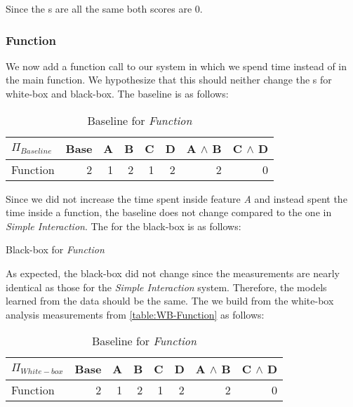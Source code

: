 Since the {\perfInfluenceModel}s are all the same both scores are 0.

\subsubsection*{Function}
We now add a function call to our system in which we spend time instead of in the main function. 
We hypothesize that this should neither change the {\perfInfluenceModel}s for white-box and black-box. 
The baseline {\perfInfluenceModel} is as follows:

\begin{table}[H]
    \centering
    \begin{tabular}{lrrrrrrr}
    \toprule
    $\Pi_{Baseline}$    & Base & A & B & C & D & A $\land$ B & C $\land$ D  \\
    \midrule
    Function &   2 &  1 &  2 &  1 &  2 &   2 &  0 \\
    \bottomrule
    \end{tabular}
    \caption{Baseline {\perfInfluenceModel} for \emph{Function}}
\end{table}

Since we did not increase the time spent inside feature \emph{A} and instead spent the time inside a function, 
the baseline {\perfInfluenceModel} does not change compared to the one in \emph{Simple Interaction}. The {\perfInfluenceModel} for 
the black-box is as follows: 

\begin{table}[H]
    \centering
    
    \caption{Black-box {\perfInfluenceModel} for \emph{Function}}
\end{table}
    
As expected, the black-box {\perfInfluenceModel} did not change since the measurements are nearly identical as those for the 
\emph{Simple Interaction} system. Therefore, the models learned from the data should be the same. 
The {\perfInfluenceModel} we build from the white-box analysis measurements from \autoref{table:WB-Function} as follows:

\begin{table}[H]
    \centering
    \begin{tabular}{lrrrrrrr}
    \toprule
    $\Pi_{White-box}$    & Base & A & B & C & D & A $\land$ B & C $\land$ D  \\
    \midrule
    Function &   2 &  1 &  2 &  1 &  2 &   2 &  0 \\
    \bottomrule
    \end{tabular}
    \caption{Baseline {\perfInfluenceModel} for \emph{Function}}
\end{table}

